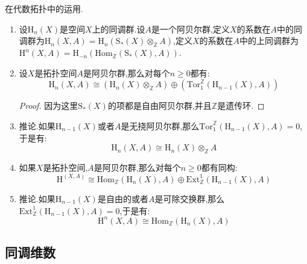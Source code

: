 在代数拓扑中的运用.
\begin{enumerate}
	\item 设$\mathrm{H}_n(X)$是空间$X$上的同调群.设$A$是一个阿贝尔群,定义$X$的系数在$A$中的同调群为$\mathrm{H}_n(X,A)=\mathrm{H}_n(\mathrm{S}_*(X)\otimes_{\mathbb{Z}}A)$,定义$X$的系数在$A$中的上同调群为$\mathrm{H}^n(X,A)=\mathrm{H}_{-n}(\mathrm{Hom}_{\mathbb{Z}}(\mathrm{S}_*(X),A))$.
	\item 设$X$是拓扑空间$A$是阿贝尔群,那么对每个$n\ge0$都有:
	$$\mathrm{H}_n(X,A)\cong\left(\mathrm{H}_n(X)\otimes_{\mathbb{Z}}A\right)\oplus\left(\mathrm{Tor}_1^{\mathbb{Z}}(\mathrm{H}_{n-1}(X),A)\right)$$
	\begin{proof}
		
		因为这里$\mathrm{S}_*(X)$的项都是自由阿贝尔群,并且$\mathbb{Z}$是遗传环.
	\end{proof}
    \item 推论.如果$\mathrm{H}_{n-1}(X)$或者$A$是无挠阿贝尔群,那么$\mathrm{Tor}_1^{\mathbb{Z}}(\mathrm{H}_{n-1}(X),A)=0$,于是有:
    $$\mathrm{H}_n(X,A)\cong\mathrm{H}_n(X)\otimes_{\mathbb{Z}}A$$
    \item 如果$X$是拓扑空间,$A$是阿贝尔群,那么对每个$n\ge0$都有同构:
    $$\mathrm{H}^(X,A)\cong\mathrm{Hom}_{\mathbb{Z}}(\mathrm{H}_n(X),A)\oplus\mathrm{Ext}_{\mathbb{Z}}^1(\mathrm{H}_{n-1}(X),A)$$
    \item 推论.如果$\mathrm{H}_{n-1}(X)$是自由的或者$A$是可除交换群,那么$\mathrm{Ext}_{\mathbb{Z}}^1(\mathrm{H}_{n-1}(X),A)=0$,于是有:
    $$\mathrm{H}^n(X,A)\cong\mathrm{Hom}_{\mathbb{Z}}(\mathrm{H}_n(X),A)$$
\end{enumerate}
\newpage
\subsection{同调维数}

